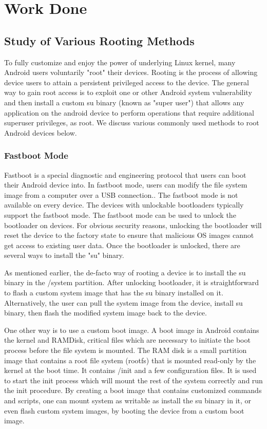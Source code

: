 \chapter{Work Done}

\section{Study of Various Rooting Methods}
To fully customize and enjoy the power of underlying Linux kernel, many Android users voluntarily "root" their devices. Rooting is the process of allowing device users to attain a persistent privileged access to the device. The general way to gain root access is to exploit one or other Android system vulnerability and then install a custom su binary (known as "super user") that allows any application on the android device to perform operations that require additional superuser privileges, as root. We discuss various commonly used methods to root Android devices below.

\subsection{Fastboot Mode}
Fastboot is a special diagnostic and engineering protocol\cite{ADBFastb81:online} that users can boot their Android device into. In fastboot mode, users can modify the file system image from a computer over a USB connection.\cite{Whatisfa82:online}. The fastboot mode is not available on every device. The devices with unlockable bootloaders typically support the fastboot\cite{fastboot} mode. The fastboot mode can be used to unlock the bootloader on devices. For obvious security reasons, unlocking the bootloader will reset the device to the factory state to ensure that malicious OS images cannot get access to existing user data. Once the bootloader is unlocked, there are several ways to install the "su" binary.

As mentioned earlier, the de-facto way of rooting a device is to install the su binary in the /system partition. After unlocking bootloader, it is straightforward to flash a custom system image that has the su binary installed on it. Alternatively, the user can pull the system image from the device, install su binary, then flash the modified system image back to the device.

One other way is to use a custom boot image. A boot image in Android contains the kernel and RAMDisk\cite{initrd}, critical files which are necessary to initiate the boot process before the file system is mounted. The RAM disk is a small partition image that contains a root file system (rootfs) that is mounted read-only by the kernel at the boot time. It contains /init and a few configuration files. It is used to start the init process which will mount the rest of the system correctly and run the init procedure\cite{ramdisk}. By creating a boot image that contains customized commands and scripts, one can mount system as writable as install the su binary in it, or even flash custom system images, by booting the device from a custom boot image.

